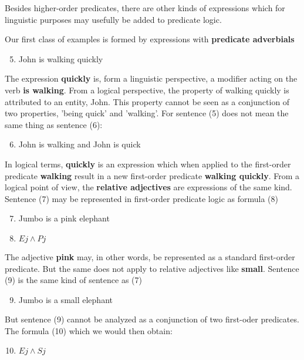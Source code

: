 \documentclass[11pt]{article}
\begin{document}
Besides higher-order predicates, there are other kinds of expressions which
for linguistic purposes may usefully be added to predicate logic.

Our first class of examples is formed by expressions with \textbf{predicate
adverbials}
\begin{enumerate}
\setcounter{enumi}{4}
\item John is walking quickly
\end{enumerate}


The expression \textbf{quickly} is, form a linguistic perspective, a modifier acting
on the verb \textbf{is walking}. From a logical perspective, the property of walking
quickly is attributed to an entity, John. This property cannot be seen as a
conjunction of two properties, 'being quick' and 'walking'. For sentence (5)
does not mean the same thing as sentence (6):
\begin{enumerate}
\setcounter{enumi}{5}
\item John is walking and John is quick
\end{enumerate}


In logical terms, \textbf{quickly} is an expression which when applied to the
first-order predicate \textbf{walking} result in a new first-order predicate \textbf{walking
quickly}. From a logical point of view, the \textbf{relative adjectives} are
expressions of the same kind. Sentence (7) may be represented in first-order
predicate logic as formula (8)
\begin{enumerate}
\setcounter{enumi}{6}
\item Jumbo is a pink elephant
\item \(Ej\wedge Pj\)
\end{enumerate}


The adjective \textbf{pink} may, in other words, be represented as a standard
first-order predicate. But the same does not apply to relative adjectives
like \textbf{small}. Sentence (9) is the same kind of sentence as (7)
\begin{enumerate}
\setcounter{enumi}{8}
\item Jumbo is a small elephant
\end{enumerate}


But sentence (9) cannot be analyzed as a conjunction of two first-oder
predicates. The formula (10) which we would then obtain:
\begin{enumerate}
\setcounter{enumi}{9}
\item \(Ej\wedge Sj\)
\end{enumerate}
\end{document}
